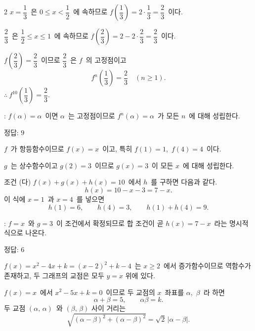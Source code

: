 \documentclass[10pt,fleqn]{article}
\begin{document}
\begin{multicols*}{2}
$x = \dfrac{1}{3}$\ 은 $0 \le x < \dfrac{1}{2}$\ 에 속하므로 $f\!\left(\dfrac{1}{3}\right) = 2 \cdot \dfrac{1}{3} = \dfrac{2}{3}$\ 이다.

$\dfrac{2}{3}$\ 은 $\dfrac{1}{2} \le x \le 1$\ 에 속하므로 $f\!\left(\dfrac{2}{3}\right) = 2 - 2 \cdot \dfrac{2}{3} = \dfrac{2}{3}$\ 이다.

$f\!\left(\dfrac{2}{3}\right) = \dfrac{2}{3}$\ 이므로 $\dfrac{2}{3}$\ 은 $f$\ 의 고정점이고
\[ f^{n}\!\left(\dfrac{1}{3}\right) = \dfrac{2}{3}\quad (n \ge 1). \]
$\therefore\ f^{10}\!\left(\dfrac{1}{3}\right) = \dfrac{2}{3}$.

\begin{dmcriticalpoint}
: $f(\alpha) = \alpha$\ 이면 $\alpha$\ 는 고정점이므로 $f^{n}(\alpha) = \alpha$\ 가 모든 $n$\ 에 대해 성립한다.
\end{dmcriticalpoint}

\begin{dmanswerbox}
정답: $9$
\end{dmanswerbox}

$f$\ 가 항등함수이므로 $f(x) = x$\ 이고, 특히 $f(1) = 1$,\ $f(4) = 4$\ 이다.

$g$\ 는 상수함수이고 $g(2) = 3$\ 이므로 $g(x) = 3$\ 이 모든 $x$\ 에 대해 성립한다.

조건 (다) $f(x) + g(x) + h(x) = 10$\ 에서 $h$\ 를 구하면 다음과 같다.
\[ h(x) = 10 - x - 3 = 7 - x. \]
이 식에 $x = 1$\ 과 $x = 4$\ 를 넣으면
\[ h(1) = 6,\qquad h(4) = 3,\qquad h(1) + h(4) = 9. \]

\begin{dmcriticalpoint}
: $f = x$\ 와 $g = 3$\ 이 조건에서 확정되므로 합 조건이 곧 $h(x) = 7 - x$\ 라는 명시적 식으로 나온다.
\end{dmcriticalpoint}

\begin{dmanswerbox}
정답: $6$
\end{dmanswerbox}

$f(x) = x^{2} - 4x + k = (x - 2)^{2} + k - 4$\ 는 $x \ge 2$\ 에서 증가함수이므로 역함수가 존재하고, 두 그래프의 교점은 모두 $y = x$ 위에 있다.

$f(x) = x$\ 에서 $x^{2} - 5x + k = 0$\ 이므로 두 교점의 $x$\ 좌표를 $\alpha$,\ $\beta$\ 라 하면
\[ \alpha + \beta = 5,\qquad \alpha\beta = k. \]
두 교점 $(\alpha,\, \alpha)$\ 와 $(\beta,\, \beta)$ 사이 거리는
\[ \sqrt{(\alpha - \beta)^{2} + (\alpha - \beta)^{2}} = \sqrt{2}\, |\alpha - \beta|. \]


\end{multicols*}
\end{document}
